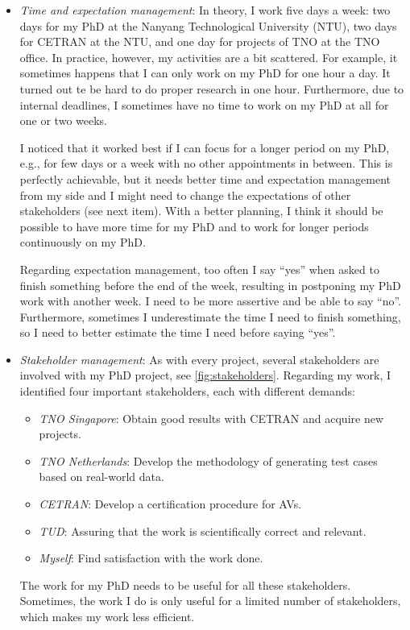 \begin{itemize}
	\item \emph{Time and expectation management}: In theory, I work five days a week: two days for my PhD at the Nanyang Technological University (NTU), two days for CETRAN at the NTU, and one day for projects of TNO at the TNO office. In practice, however, my activities are a bit scattered. For example, it sometimes happens that I can only work on my PhD for one hour a day. It turned out te be hard to do proper research in one hour. Furthermore, due to internal deadlines, I sometimes have no time to work on my PhD at all for one or two weeks.
	
	I noticed that it worked best if I can focus for a longer period on my PhD, e.g., for few days or a week with no other appointments in between. This is perfectly achievable, but it needs better time and expectation management from my side and I might need to change the expectations of other stakeholders (see next item). With a better planning, I think it should be possible to have more time for my PhD and to work for longer periods continuously on my PhD.
	
	Regarding expectation management, too often I say ``yes'' when asked to finish something before the end of the week, resulting in postponing my PhD work with another week. I need to be more assertive and be able to say ``no''. Furthermore, sometimes I underestimate the time I need to finish something, so I need to better estimate the time I need before saying ``yes''.
	
	\item \emph{Stakeholder management}: As with every project, several stakeholders are involved with my PhD project, see \cref{fig:stakeholders}. Regarding my work, I identified four important stakeholders, each with different demands:
	\begin{itemize}
		\item \emph{TNO Singapore}: Obtain good results with CETRAN and acquire new projects.
		\item \emph{TNO Netherlands}: Develop the methodology of generating test cases based on real-world data.
		\item \emph{CETRAN}: Develop a certification procedure for AVs.
		\item \emph{TUD}: Assuring that the work is scientifically correct and relevant.
		\item \emph{Myself}: Find satisfaction with the work done.
	\end{itemize}
	The work for my PhD needs to be useful for all these stakeholders. Sometimes, the work I do is only useful for a limited number of stakeholders, which makes my work less efficient.
	

\end{itemize}
